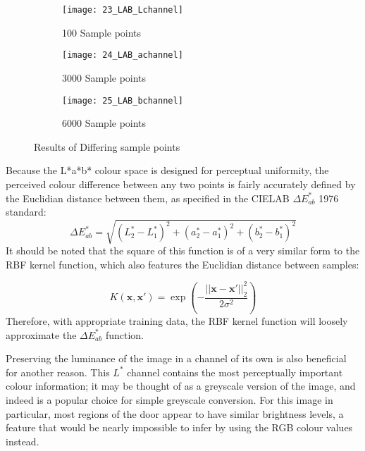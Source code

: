 \begin{figure}[h]
        \centering
        \begin{subfigure}[b]{0.33\textwidth}
                \centering
                \texttt{[image: 23\_LAB\_Lchannel]}
                \caption{100 Sample points}
                \label{fig:23_LAB_Lchannel}
        \end{subfigure}%
        \begin{subfigure}[b]{0.33\textwidth}
                \centering

                \texttt{[image: 24\_LAB\_achannel]}
                \caption{3000 Sample points}
                \label{fig:24_LAB_achannel}     
        \end{subfigure}
        \begin{subfigure}[b]{0.33\textwidth}
                \centering
                \texttt{[image: 25\_LAB\_bchannel]}
                \caption{6000 Sample points}
                \label{fig:25_LAB_bchannel}     
        \end{subfigure}
        \caption{Results of Differing sample points}\label{fig:labchannels}
\end{figure}

Because the L*a*b* colour space is designed for perceptual uniformity, the perceived colour difference between any two points is fairly accurately defined by the Euclidian distance between them, as specified in the CIELAB $\Delta E_{ab}^*$ 1976 standard:
\begin{equation}
\Delta E_{ab}^* = \sqrt{ (L^*_2-L^*_1)^2+(a^*_2-a^*_1)^2 + (b^*_2-b^*_1)^2 }
\end{equation}
It should be noted that the square of this function is of a very similar form to the RBF kernel function, which also features the Euclidian distance between samples:

\begin{equation}
K(\mathbf{x}, \mathbf{x'}) = \exp\left(-\frac{||\mathbf{x} - \mathbf{x'}||_2^2}{2\sigma^2}\right)
\end{equation}
Therefore, with appropriate training data, the RBF kernel function will loosely approximate the $\Delta E_{ab}^*$ function.

  Preserving the luminance of the image in a channel of its own is also beneficial for another reason. This $L^*$ channel contains the most perceptually important colour information; it may be thought of as a greyscale version of the image, and indeed is a popular choice for simple greyscale conversion. For this image in particular, most regions of the door appear to have similar brightness levels, a feature that would be nearly impossible to infer by using the RGB colour values instead.

